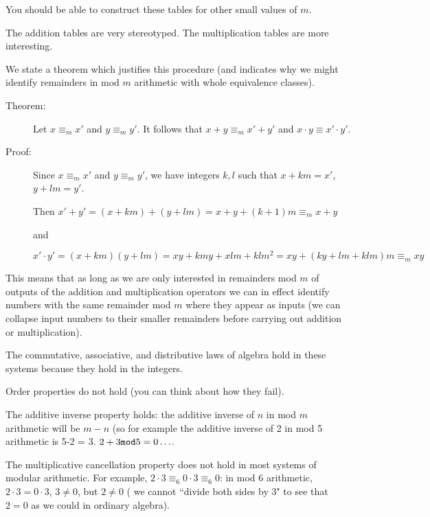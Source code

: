 \documentclass[12pt]{article}
\begin{document}
You should be able to construct these tables for other small values of $m$.

The addition tables are very stereotyped.  The multiplication tables are more interesting.


We state a theorem which justifies this procedure (and indicates why we might identify remainders in mod $m$ arithmetic with whole equivalence classes).

\begin{description}

\item[Theorem:]  Let $x \equiv_m x'$ and $y \equiv_m y'$.  It follows that $x+y \equiv_m x'+y'$ and
$x \cdot y \equiv x' \cdot y'$.

\item[Proof:]

Since $x \equiv_m x'$ and $y \equiv_m y'$, we have integers $k,l$ such that $x+km=x'$, $y+lm = y'$.

Then $x'+y' = (x+km) + (y+lm) = x+y +(k+1)m \equiv_m x+y$

and

$x' \cdot y' = (x+km)(y+lm) = xy + kmy + xlm + klm^2 = xy + (ky+lm+klm)m \equiv_m xy$

\end{description}

This means that as long as we are only interested in remainders mod $m$ of outputs of the addition and multiplication operators we can in effect identify numbers with the same remainder mod $m$ where they appear as inputs (we can collapse input numbers to their smaller remainders before carrying out addition or multiplication).


The commutative, associative, and distributive laws of algebra hold in these systems because they hold in the integers.

Order properties do not hold (you can think about how they fail).

The additive inverse property holds:  the additive inverse of $n$ in mod $m$ arithmetic will be $m-n$ (so for example the additive inverse of 2 in mod 5 arithmetic is 5-2 = 3.  $2+3 {\tt mod} 5 = 0\ldots$.

The multiplicative cancellation property does not hold in most systems of modular arithmetic.  For example,
$2\cdot 3 \equiv_6 0 \cdot 3 \equiv_6 0$:  in mod 6 arithmetic, $2\cdot 3 = 0 \cdot 3$, $3 \neq 0$, but $2 \neq 0$ ( we cannot ``divide both sides by 3" to see that $2=0$ as we could in ordinary algebra).
\end{document}
